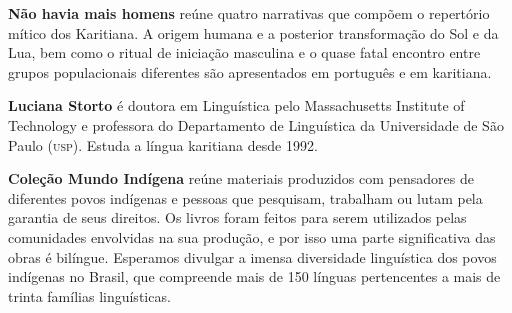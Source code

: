 \textbf{Não havia mais homens} reúne quatro narrativas que compõem o repertório mítico dos Karitiana. 
A origem humana e a posterior transformação do Sol e da Lua, bem como o ritual de iniciação masculina
e o quase fatal encontro entre grupos populacionais diferentes são apresentados em português e em karitiana. 

\textbf{Luciana Storto} é doutora em Linguística pelo Massachusetts Institute of
Technology e professora do Departamento de Linguística da Universidade
de São Paulo (\textsc{usp}). Estuda a língua karitiana desde 1992.



\textbf{Coleção Mundo Indígena} reúne materiais produzidos com pensadores de diferentes povos indígenas e pessoas que pesquisam, trabalham ou lutam pela garantia de seus direitos. Os livros foram feitos para serem utilizados pelas comunidades envolvidas na sua produção, e por isso uma parte significativa das obras é bilíngue. Esperamos divulgar a imensa diversidade linguística dos povos indígenas no Brasil, que compreende mais de 150 línguas pertencentes a mais de trinta famílias linguísticas.

